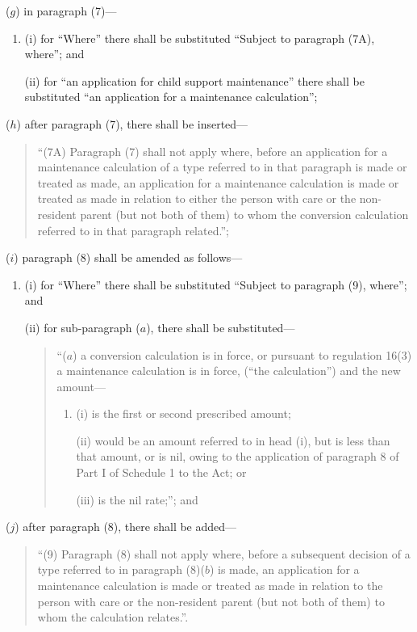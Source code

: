 \documentclass[12pt,a4paper]{article}
\begin{document}
\begin{enumerate}
($g$) in paragraph (7)—
\begin{enumerate}\item[]
(i) for “Where” there shall be substituted “Subject to paragraph (7A), where”; and

(ii) for “an application for child support maintenance” there shall be substituted “an application for a maintenance calculation”;
\end{enumerate}

($h$) after paragraph (7), there shall be inserted—
\begin{quotation}
“(7A) Paragraph (7) shall not apply where, before an application for a maintenance calculation of a type referred to in that paragraph is made or treated as made, an application for a maintenance calculation is made or treated as made in relation to either the person with care or the non-resident parent (but not both of them) to whom the conversion calculation referred to in that paragraph related.”;
\end{quotation}

($i$) paragraph (8) shall be amended as follows—
\begin{enumerate}\item[]
(i) for “Where” there shall be substituted “Subject to paragraph (9), where”; and

(ii) for sub-paragraph ($a$), there shall be substituted—
\begin{quotation}
“($a$) a conversion calculation is in force, or pursuant to regulation 16(3) a maintenance calculation is in force, (“the calculation”) and the new amount—
\begin{enumerate}\item[]
(i) is the first or second prescribed amount;

(ii) would be an amount referred to in head (i), but is less than that amount, or is nil, owing to the application of paragraph 8 of Part I of Schedule 1 to the Act; or

(iii) is the nil rate;”; and
\end{enumerate}
\end{quotation}
\end{enumerate}

($j$) after paragraph (8), there shall be added—
\begin{quotation}
“(9) Paragraph (8) shall not apply where, before a subsequent decision of a type referred to in paragraph (8)($b$)  is made, an application for a maintenance calculation is made or treated as made in relation to the person with care or the non-resident parent (but not both of them) to whom the calculation relates.”.
\end{quotation}
\end{enumerate}
\end{document}
